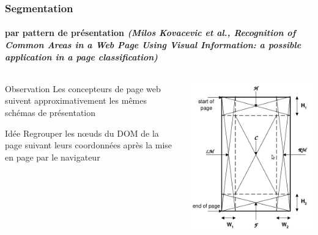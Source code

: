 \documentclass[9pt]{beamer}
\begin{document}
\begin{frame}
\frametitle{Segmentation}
\framesubtitle{par pattern de présentation \textit{(Milos Kovacevic et al., Recognition of Common Areas in a Web Page Using Visual Information: a possible application in a page classification)}}
\begin{columns}
	\begin{column}{5cm}
	\begin{block}{Observation}
		Les concepteurs de page web suivent approximativement les mêmes schémas de présentation
	\end{block}
	\begin{block}{Idée}
		Regrouper les n\oe{}uds du DOM de la page suivant leurs coordonnées après la mise en page par le navigateur
	\end{block}
	\end{column}
	\begin{column}{5cm}
		\includegraphics[scale=0.3]{img/segmentation-pattern.jpg}
	\end{column}
\end{columns}
\end{frame}
\end{document}
